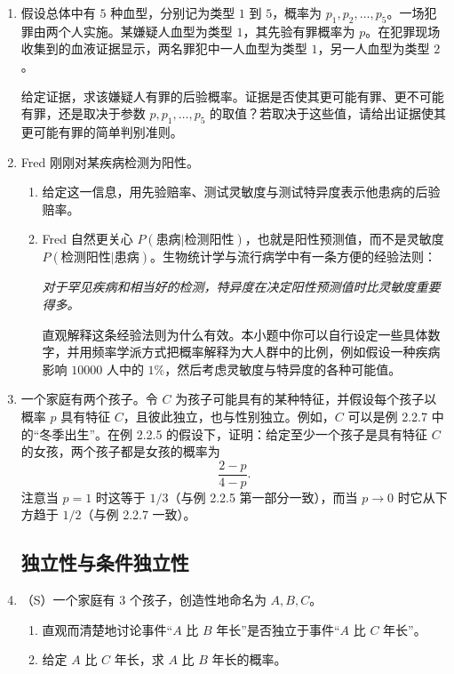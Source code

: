 \documentclass[UTF8,12pt,a4paper,fontset=fandol]{ctexart}
\begin{document}
\begin{enumerate}
  \item 假设总体中有 $5$ 种血型，分别记为类型 $1$ 到 $5$，概率为 $p_1,p_2,\ldots,p_5$。一场犯罪由两个人实施。某嫌疑人血型为类型 $1$，其先验有罪概率为 $p$。在犯罪现场收集到的血液证据显示，两名罪犯中一人血型为类型 $1$，另一人血型为类型 $2$。

  给定证据，求该嫌疑人有罪的后验概率。证据是否使其更可能有罪、更不可能有罪，还是取决于参数 $p,p_1,\ldots,p_5$ 的取值？若取决于这些值，请给出证据使其更可能有罪的简单判别准则。

  \item Fred 刚刚对某疾病检测为阳性。
  \begin{enumerate}
    \item 给定这一信息，用先验赔率、测试灵敏度与测试特异度表示他患病的后验赔率。
    \item Fred 自然更关心 $P(\text{患病}|\text{检测阳性})$，也就是阳性预测值，而不是灵敏度 $P(\text{检测阳性}|\text{患病})$。生物统计学与流行病学中有一条方便的经验法则：

    \textit{对于罕见疾病和相当好的检测，特异度在决定阳性预测值时比灵敏度重要得多。}

    直观解释这条经验法则为什么有效。本小题中你可以自行设定一些具体数字，并用频率学派方式把概率解释为大人群中的比例，例如假设一种疾病影响 $10000$ 人中的 $1\%$，然后考虑灵敏度与特异度的各种可能值。
  \end{enumerate}

  \item 一个家庭有两个孩子。令 $C$ 为孩子可能具有的某种特征，并假设每个孩子以概率 $p$ 具有特征 $C$，且彼此独立，也与性别独立。例如，$C$ 可以是例 2.2.7 中的“冬季出生”。在例 2.2.5 的假设下，证明：给定至少一个孩子是具有特征 $C$ 的女孩，两个孩子都是女孩的概率为
  \[
    \frac{2-p}{4-p}.
  \]
  注意当 $p=1$ 时这等于 $1/3$（与例 2.2.5 第一部分一致），而当 $p\to 0$ 时它从下方趋于 $1/2$（与例 2.2.7 一致）。

\subsection*{独立性与条件独立性}

  \item （S）一个家庭有 $3$ 个孩子，创造性地命名为 $A,B,C$。
  \begin{enumerate}
    \item 直观而清楚地讨论事件“$A$ 比 $B$ 年长”是否独立于事件“$A$ 比 $C$ 年长”。
    \item 给定 $A$ 比 $C$ 年长，求 $A$ 比 $B$ 年长的概率。
  \end{enumerate}


\end{enumerate}
\end{document}
